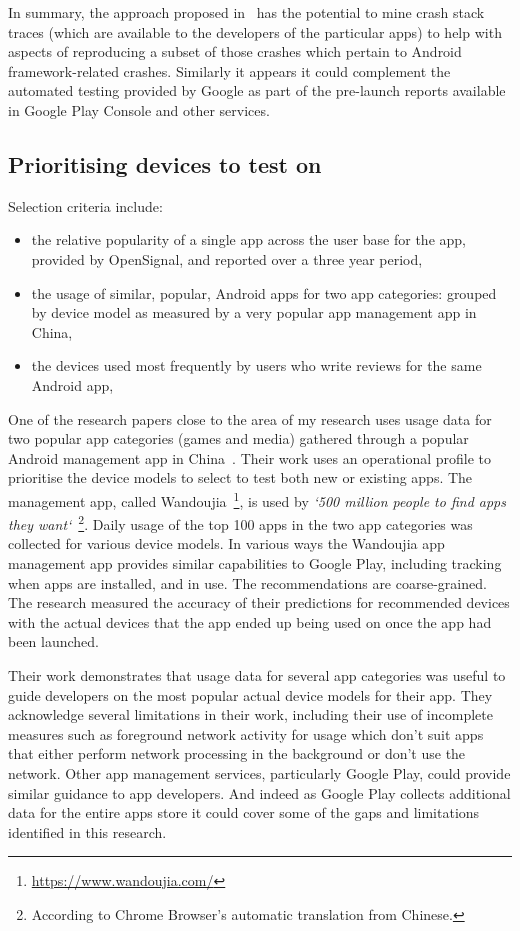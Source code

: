 In summary, the approach proposed in~\citep{kong2019_mining_android_crash_fixes} has the potential to mine crash stack traces (which are available to the developers of the particular apps) to help with aspects of reproducing a subset of those crashes which pertain to Android framework-related crashes. Similarly it appears it could complement the automated testing provided by Google as part of the pre-launch reports available in Google Play Console and other services. 

\subsection{Prioritising devices to test on}

Selection criteria include:
\begin{itemize}
    \item the relative popularity of a single app across the user base for the app, provided by OpenSignal, and reported over a three year period,
    \item the usage of similar, popular, Android apps for two app categories: grouped by device model as measured by a very popular app management app in China,
    \item the devices used most frequently by users who write reviews for the same Android app,
\end{itemize}

One of the research papers close to the area of my research uses usage data for two popular app categories (games and media) gathered through a popular Android management app in China~\citep{lu2016_PRADA}. Their work uses an operational profile to prioritise the device models to select to test both new or existing apps. The management app, called Wandoujia~\footnote{\url{https://www.wandoujia.com/}}, is used by \emph{`500 million people to find apps they want`}~\footnote{According to Chrome Browser's automatic translation from Chinese.}. Daily usage of the top 100 apps in the two app categories was collected for various device models. In various ways the Wandoujia app management app provides similar capabilities to Google Play, including tracking when apps are installed, and in use. The recommendations are coarse-grained. The research measured the accuracy of their predictions for recommended devices with the actual devices that the app ended up being used on once the app had been launched. 

Their work demonstrates that usage data for several app categories was useful to guide developers on the most popular actual device models for their app. They acknowledge several limitations in their work, including their use of incomplete measures such as foreground network activity for usage which don't suit apps that either perform network processing in the background or don't use the network. Other app management services, particularly Google Play, could provide similar guidance to app developers. And indeed as Google Play collects additional data for the entire apps store it could cover some of the gaps and limitations identified in this research.


